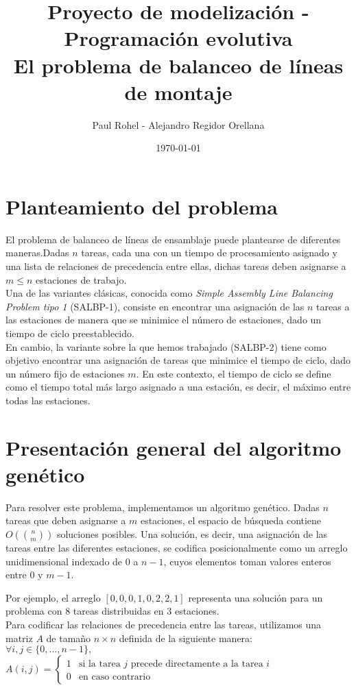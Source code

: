 \documentclass[12pt]{report}
\title{Proyecto de modelización - Programación evolutiva\\ \textbf{El problema de balanceo de líneas de montaje}}
\author{Paul Rohel - Alejandro Regidor Orellana}
\date{\today}
\begin{document}
\maketitle
\tableofcontents

\chapter{Planteamiento del problema}

El problema de balanceo de líneas de ensamblaje puede plantearse de diferentes maneras.Dadas $n$ tareas, cada una con un tiempo de procesamiento asignado y una lista de relaciones de precedencia entre ellas, dichas tareas deben asignarse a $m \leq n$ estaciones de trabajo.\\
Una de las variantes clásicas, conocida como \textit{Simple Assembly Line Balancing Problem tipo 1} (SALBP-1), consiste en encontrar una asignación de las $n$ tareas a las estaciones de manera que se minimice el número de estaciones, dado un tiempo de ciclo preestablecido.\\
En cambio, la variante sobre la que hemos trabajado (SALBP-2) tiene como objetivo encontrar una asignación de tareas que minimice el tiempo de ciclo, dado un número fijo de estaciones $m$. En este contexto, el tiempo de ciclo se define como el tiempo total más largo asignado a una estación, es decir, el máximo entre todas las estaciones.

\chapter{Presentación general del algoritmo genético}

Para resolver este problema, implementamos un algoritmo genético. 
Dadas $n$ tareas que deben asignarse a $m$ estaciones, el espacio de búsqueda contiene $O\left(\binom{n}{m}\right)$ soluciones posibles. 
Una solución, es decir, una asignación de las tareas entre las diferentes estaciones, se codifica posicionalmente como un arreglo unidimensional indexado de $0$ a $n-1$, 
cuyos elementos toman valores enteros entre $0$ y $m-1$.

Por ejemplo, el arreglo $[0, 0, 0, 1, 0, 2, 2, 1]$ representa una solución para un problema con $8$ tareas distribuidas en $3$ estaciones.\\

Para codificar las relaciones de precedencia entre las tareas, utilizamos una matriz $A$ de tamaño $n \times n$ definida de la siguiente manera:\\
$
\forall i,j \in \{0,\dots,n-1\},$\\
$
A(i,j) = 
\begin{cases}
1 & \text{si la tarea } j \text{ precede directamente a la tarea } i \\
0 & \text{en caso contrario}
\end{cases}
$\\
\end{document}
